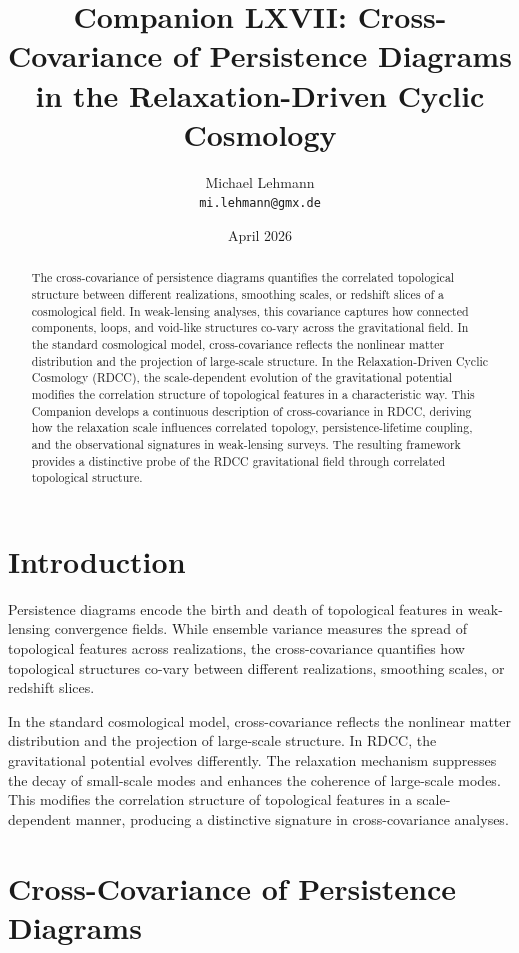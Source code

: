 \documentclass[11pt,a4paper]{article}
\title{\textbf{Companion LXVII: Cross-Covariance of Persistence Diagrams in the Relaxation-Driven Cyclic Cosmology}}
\author{Michael Lehmann \\ \texttt{mi.lehmann@gmx.de}}
\date{April 2026}
\begin{document}
\maketitle

\begin{abstract}
The cross-covariance of persistence diagrams quantifies the correlated topological 
structure between different realizations, smoothing scales, or redshift slices of a 
cosmological field. In weak-lensing analyses, this covariance captures how 
connected components, loops, and void-like structures co-vary across the 
gravitational field. In the standard cosmological model, cross-covariance reflects 
the nonlinear matter distribution and the projection of large-scale structure. In 
the Relaxation-Driven Cyclic Cosmology (RDCC), the scale-dependent evolution of the 
gravitational potential modifies the correlation structure of topological features 
in a characteristic way. This Companion develops a continuous description of 
cross-covariance in RDCC, deriving how the relaxation scale influences correlated 
topology, persistence-lifetime coupling, and the observational signatures in 
weak-lensing surveys. The resulting framework provides a distinctive probe of the 
RDCC gravitational field through correlated topological structure.
\end{abstract}
\section{Introduction}

Persistence diagrams encode the birth and death of topological features in 
weak-lensing convergence fields. While ensemble variance measures the spread of 
topological features across realizations, the cross-covariance quantifies how 
topological structures co-vary between different realizations, smoothing scales, or 
redshift slices.

In the standard cosmological model, cross-covariance reflects the nonlinear matter 
distribution and the projection of large-scale structure. In RDCC, the 
gravitational potential evolves differently. The relaxation mechanism suppresses 
the decay of small-scale modes and enhances the coherence of large-scale modes. 
This modifies the correlation structure of topological features in a scale-dependent 
manner, producing a distinctive signature in cross-covariance analyses.
\section{Cross-Covariance of Persistence Diagrams}
\end{document}
